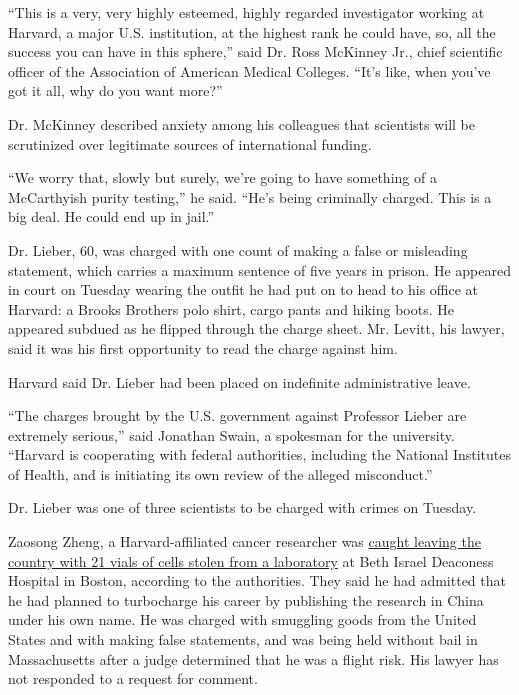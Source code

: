 ``This is a very, very highly esteemed, highly regarded investigator
working at Harvard, a major U.S. institution, at the highest rank he
could have, so, all the success you can have in this sphere,'' said Dr.
Ross McKinney Jr., chief scientific officer of the Association of
American Medical Colleges. ``It's like, when you've got it all, why do
you want more?''

Dr. McKinney described anxiety among his colleagues that scientists will
be scrutinized over legitimate sources of international funding.

``We worry that, slowly but surely, we're going to have something of a
McCarthyish purity testing,'' he said. ``He's being criminally charged.
This is a big deal. He could end up in jail.''

Dr. Lieber, 60, was charged with one count of making a false or
misleading statement, which carries a maximum sentence of five years in
prison. He appeared in court on Tuesday wearing the outfit he had put on
to head to his office at Harvard: a Brooks Brothers polo shirt, cargo
pants and hiking boots. He appeared subdued as he flipped through the
charge sheet. Mr. Levitt, his lawyer, said it was his first opportunity
to read the charge against him.

Harvard said Dr. Lieber had been placed on indefinite administrative
leave.

``The charges brought by the U.S. government against Professor Lieber
are extremely serious,'' said Jonathan Swain, a spokesman for the
university. ``Harvard is cooperating with federal authorities, including
the National Institutes of Health, and is initiating its own review of
the alleged misconduct.''

Dr. Lieber was one of three scientists to be charged with crimes on
Tuesday.

Zaosong Zheng, a Harvard-affiliated cancer researcher was
\href{https://www.nytimes.com/2019/12/31/us/chinese-scientist-cancer-research-investigation.html}{caught
leaving the country with 21 vials of cells stolen from a laboratory} at
Beth Israel Deaconess Hospital in Boston, according to the authorities.
They said he had admitted that he had planned to turbocharge his career
by publishing the research in China under his own name. He was charged
with smuggling goods from the United States and with making false
statements, and was being held without bail in Massachusetts after a
judge determined that he was a flight risk. His lawyer has not responded
to a request for comment.

